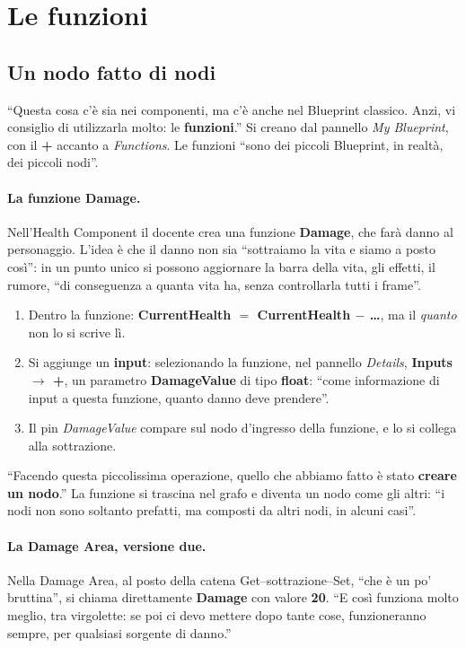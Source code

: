 \section{Le funzioni}
\label{gd13:sec:funzioni}

\subsection{Un nodo fatto di nodi}

``Questa cosa c'è sia nei componenti, ma c'è anche nel Blueprint classico.
Anzi, vi consiglio di utilizzarla molto: le \textbf{funzioni}.'' Si creano dal
pannello \emph{My Blueprint}, con il \textbf{+} accanto a \emph{Functions}. Le
funzioni ``sono dei piccoli Blueprint, in realtà, dei piccoli nodi''.

\paragraph{La funzione Damage.} Nell'Health Component il docente crea una
funzione \textbf{Damage}, che farà danno al personaggio. L'idea è che il danno
non sia ``sottraiamo la vita e siamo a posto così'': in un punto unico si possono
aggiornare la barra della vita, gli effetti, il rumore, ``di conseguenza a
quanta vita ha, senza controllarla tutti i frame''.
\begin{enumerate}
  \item Dentro la funzione: \textbf{CurrentHealth $=$ CurrentHealth $-$
        \dots}, ma il \emph{quanto} non lo si scrive lì.
  \item Si aggiunge un \textbf{input}: selezionando la funzione, nel pannello
        \emph{Details}, \textbf{Inputs $\rightarrow$ +}, un parametro
        \textbf{DamageValue} di tipo \textbf{float}: ``come informazione di
        input a questa funzione, quanto danno deve prendere''.
  \item Il pin \emph{DamageValue} compare sul nodo d'ingresso della funzione, e
        lo si collega alla sottrazione.
\end{enumerate}
``Facendo questa piccolissima operazione, quello che abbiamo fatto è stato
\textbf{creare un nodo}.'' La funzione si trascina nel grafo e diventa un nodo
come gli altri: ``i nodi non sono soltanto prefatti, ma composti da altri nodi,
in alcuni casi''.

\paragraph{La Damage Area, versione due.} Nella Damage Area, al posto della
catena Get--sottrazione--Set, ``che è un po' bruttina'', si chiama
direttamente \textbf{Damage} con valore \textbf{20}. ``E così funziona molto
meglio, tra virgolette: se poi ci devo mettere dopo tante cose, funzioneranno
sempre, per qualsiasi sorgente di danno.''

